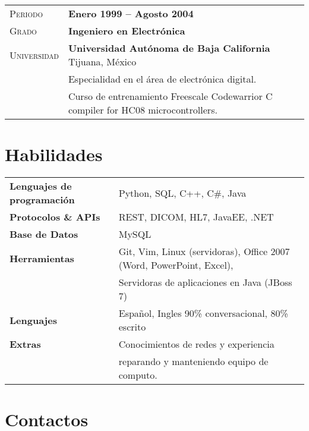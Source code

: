 \documentclass[letter, oneside, final]{scrartcl} %
\newcommand{\gray}{\rowcolor[gray]{.90}} %
\begin{document}
\begin{center}
\vspace{12pt}

\begin{tabularx}{0.97\linewidth}{>{\raggedleft\scshape}p{2cm}X}
\gray Periodo & \textbf{Enero 1999 -- Agosto 2004}\\
\gray Grado & \textbf{Ingeniero en Electrónica}\\
\gray Universidad & \textbf{Universidad Autónoma de Baja California} \hfill Tijuana, México\\
& Especialidad en el área de electrónica digital.\\
& Curso de entrenamiento Freescale Codewarrior C compiler for HC08 microcontrollers.
\end{tabularx}



\section{Habilidades}

\begin{tabular}{ @{} >{\bfseries}l @{\hspace{6ex}} l }
Lenguajes de programación & Python, SQL, C++, C\#, Java \\
Protocolos \& APIs & REST, DICOM, HL7, JavaEE, .NET \\
Base de Datos & MySQL \\
Herramientas & Git, Vim, Linux (servidoras), Office 2007 (Word, PowerPoint, Excel),\\
& Servidoras de aplicaciones en Java (JBoss 7) \\
Lenguajes & Español, Ingles 90\% conversacional, 80\% escrito\\
Extras & Conocimientos de redes y experiencia\\
& reparando y manteniendo equipo de computo.
\end{tabular}


\section{Contactos}


\end{center}
\end{document}
